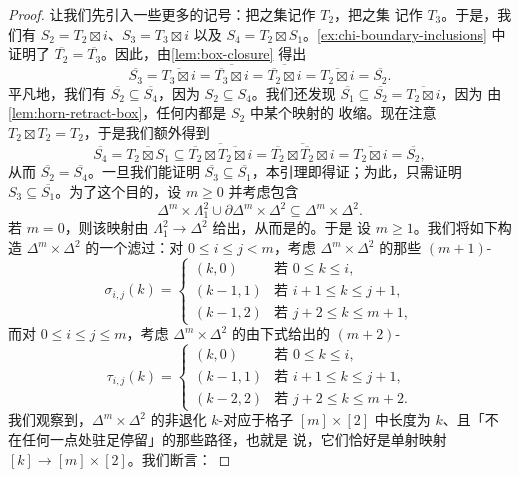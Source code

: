 \begin{proof}
让我们先引入一些更多的记号：把\trMonomorphism{}之集记作 $T_2$，把\trBoundaryInclusion{}之集
记作 $T_3$。于是，我们有 $S_2 = T_2 \boxtimes i$、$S_3 = T_3 \boxtimes i$ 以及
$S_4 = T_2 \boxtimes S_1$。\cref{ex:chi-boundary-inclusions} 中证明了
$\overline{T_2} = \overline{T_3}$。因此，由\cref{lem:box-closure} 得出
\[
\overline{S_3} = \overline{T_3 \boxtimes i} =
\overline{\overline{T_3} \boxtimes i} =
\overline{\overline{T_2} \boxtimes i} =
\overline{T_2 \boxtimes i} = \overline{S_2}.
\]
平凡地，我们有 $\overline{S_2} \subseteq \overline{S_4}$，因为
$S_2 \subseteq S_4$。我们还发现
$\overline{S_1} \subseteq \overline{S_2} = \overline{T_2 \boxtimes i}$，因为
由\cref{lem:horn-retract-box}，任何内\trHornInclusion{}都是 $S_2$ 中某个映射的
收缩。现在注意 $T_2 \boxtimes T_2 = T_2$，于是我们额外得到
\[
\overline{S_4} = \overline{T_2 \boxtimes S_1} \subseteq
\overline{\overline{T_2} \boxtimes \overline{T_2 \boxtimes i}} =
\overline{\overline{T_2} \boxtimes \overline{T_2} \boxtimes i} =
\overline{T_2 \boxtimes i} = \overline{S_2},
\]
从而 $\overline{S_2} = \overline{S_4}$。一旦我们能证明
$\overline{S_3} \subseteq \overline{S_1}$，本引理即得证；为此，只需证明
$S_3 \subseteq \overline{S_1}$。为了这个目的，设 $m \ge 0$ 并考虑包含
\[
\Delta^m \times \Lambda^2_1 \cup \partial\Delta^m \times \Delta^2
\subseteq \Delta^m \times \Delta^2.
\]
若 $m = 0$，则该映射由 $\Lambda^2_1 \to \Delta^2$ 给出，从而是\trInnerAnodyne{}的。于是
设 $m \ge 1$。我们将如下构造 $\Delta^m \times \Delta^2$ 的一个滤过：对
$0 \le i \le j < m$，考虑 $\Delta^m \times \Delta^2$ 的那些 $(m+1)$-\trSimplex{}%
\[
\sigma_{i,j}(k) =
\begin{cases}
(k, 0) & \text{若 } 0 \le k \le i,\\
(k - 1, 1) & \text{若 } i + 1 \le k \le j + 1,\\
(k - 1, 2) & \text{若 } j + 2 \le k \le m + 1,
\end{cases}
\]
而对 $0 \le i \le j \le m$，考虑 $\Delta^m \times \Delta^2$ 的由下式给出的
$(m+2)$-\trSimplex{}%
\[
\tau_{i,j}(k) =
\begin{cases}
(k, 0) & \text{若 } 0 \le k \le i,\\
(k - 1, 1) & \text{若 } i + 1 \le k \le j + 1,\\
(k - 2, 2) & \text{若 } j + 2 \le k \le m + 2.
\end{cases}
\]
我们观察到，$\Delta^m \times \Delta^2$ 的非退化 $k$-\trSimplex{}对应于格子
$[m] \times [2]$ 中长度为 $k$、且「不在任何一点处驻足停留」的那些路径，也就是
说，它们恰好是单射映射 $[k] \to [m] \times [2]$。我们断言：

\end{proof}
